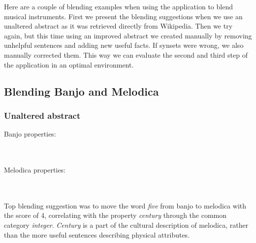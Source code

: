 Here are a couple of blending examples when using the application to blend musical instruments. First we present the blending suggestions when we use an unaltered abstract as it was retrieved directly from Wikipedia. Then we try again, but this time using an improved abstract we created manually by removing unhelpful sentences and adding new useful facts. If synsets were wrong, we also manually corrected them. This way we can evaluate the second and third step of the application in an optimal environment.

\subsection{Blending Banjo and Melodica}

\subsubsection{Unaltered abstract}

Banjo properties:

\noindent{}
\\\\Melodica properties:

\noindent{}
\\\\Top blending suggestion was to move the word \emph{five} from banjo to melodica with the score of 4, correlating with the property \emph{century} through the common category \emph{integer}. \emph{Century} is a part of the cultural description of melodica, rather than the more useful sentences describing physical attributes.

